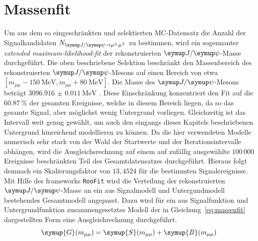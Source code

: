 \section{Massenfit}
\label{sec:massenfit}
Um aus dem so eingeschränkten und selektierten MC-Datensatz die Anzahl der Signalkandidaten $N_{\kontroll}$ zu bestimmen, wird ein sogennanter \textit{extended maximum-likelihood-fit} \cite{extended} der rekonstruierten $\jpsi$-Masse durchgeführt. Die oben
beschriebene Selektion beschränkt den Massenbereich des rekonstruierten $\jpsi$-Mesons auf einen Bereich von etwa
$[m_{\mu\mu}-\SI{150}{\mega\electronvolt}, m_{\mu\mu}+\SI{80}{\mega\electronvolt}]$. Die Masse des $\jpsi$-Mesons beträgt $\SI{3096.916(11)}{\mega\electronvolt}$ \cite{pdg}. Diese Einschränkung konzentriert den Fit auf die $\SI{60.87}{\percent}$ der gesamten Ereignisse, welche in diesem Bereich liegen, da so das gesamte Signal, aber möglichst wenig Untergrund vorliegen. Gleichzeitig ist das Intervall weit genug gewählt, um auch den eingangs dieses Kapitels beschriebenen Untergrund hinreichend modellieren zu können. Da die hier verwendeten Modelle numerisch sehr stark von der Wahl der Startwerte und der Iterationsintervalle abhängen, wird die Ausgleichsrechnung auf einem auf zufällig ausgewählte $100\,000$ Ereignisse beschränkten Teil des Gesamtdatensatzes durchgeführt. Hieraus folgt demnach ein Skalierungsfaktor von $13,4524$ für die bestimmten Signalereignisse. \\
%
%
Mit Hilfe des frameworks \texttt{RooFit} \cite{roofit} wird die Verteilung der rekonstruierten $\jpsi$-Masse an ein aus Signalmodell und Untergundmodell bestehendes Gesamtmodell angepasst. Dazu wird für ein aus Signalfunktion und Untergrundfunktion zusammengesetztes Modell der in Gleichung~\ref{eq:massenfit} dargestellten Form eine Ausgleichrechnung durchgeführt.
%
\begin{equation}
  \symup{G}(m_{\mu\mu})= \symup{S}(m_{\mu\mu}) + \symup{B}(m_{\mu\mu})
  \label{eq:massenfit}
\end{equation}
%

